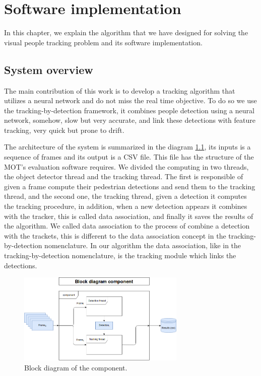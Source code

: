 \chapter{Software implementation}\label{cap.software}

In this chapter, we explain the algorithm that we have designed for solving the visual people tracking problem and its software implementation. 

\section{System overview}

The main contribution of this work is to develop a tracking algorithm that utilizes a neural network and do not miss the real time objective. To do so we use the tracking-by-detection framework, it combines people detection using a neural network, somehow, slow but very accurate, and link these detections with feature tracking, very quick but prone to drift. 

The architecture of the system is summarized in the diagram \ref{software1}, its inputs is a sequence of frames and its output is a CSV file. This file has the structure of the MOT's evaluation software requires. We divided the computing in two threads, the object detector thread and the tracking thread. The first is responsible of given a frame compute their pedestrian detections and send them to the tracking thread, and the second one, the tracking thread, given a detection it computes the tracking procedure, in addition, when a new detection appears it combines with the tracker, this is called data association, and finally it saves the results of the algorithm. We called data association to the process of combine a detection with the trackets, this is different to the data association concept in the tracking-by-detection nomenclature. In our algorithm the data association, like in the tracking-by-detection nomenclature, is the tracking module which links the detections. 



\begin{figure}[H]
\centering         
\includegraphics[width=8cm]{flows/bloque.png}
\caption{Block diagram of the component.} \label{software1}
\end{figure}


